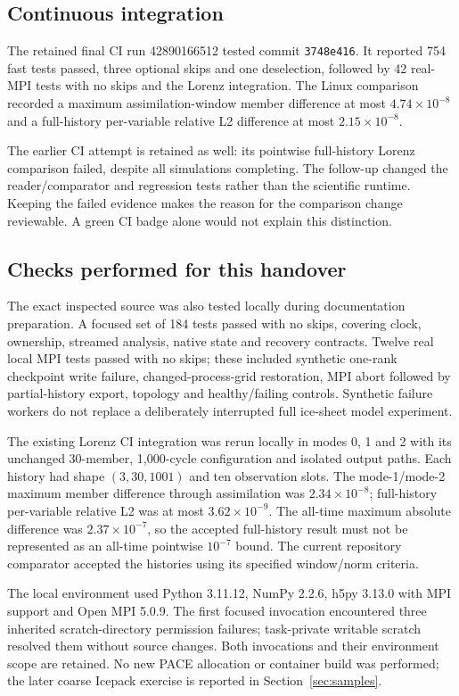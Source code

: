 \documentclass[11pt,a4paper]{article}
\newcommand{\code}[1]{\nolinkurl{#1}}
\begin{document}
\subsection{Continuous integration}
The retained final CI run 42890166512 tested commit \code{3748e416}. It reported 754 fast tests passed, three optional skips and one deselection, followed by 42 real-MPI tests with no skips and the Lorenz integration. The Linux comparison recorded a maximum assimilation-window member difference at most \(4.74\times10^{-8}\) and a full-history per-variable relative L2 difference at most \(2.15\times10^{-8}\).

The earlier CI attempt is retained as well: its pointwise full-history Lorenz comparison failed, despite all simulations completing. The follow-up changed the reader/comparator and regression tests rather than the scientific runtime. Keeping the failed evidence makes the reason for the comparison change reviewable. A green CI badge alone would not explain this distinction.

\subsection{Checks performed for this handover}
The exact inspected source was also tested locally during documentation preparation. A focused set of 184 tests passed with no skips, covering clock, ownership, streamed analysis, native state and recovery contracts. Twelve real local MPI tests passed with no skips; these included synthetic one-rank checkpoint write failure, changed-process-grid restoration, MPI abort followed by partial-history export, topology and healthy/failing controls. Synthetic failure workers do not replace a deliberately interrupted full ice-sheet model experiment.

The existing Lorenz CI integration was rerun locally in modes 0, 1 and 2 with its unchanged 30-member, 1,000-cycle configuration and isolated output paths. Each history had shape \((3,30,1001)\) and ten observation slots. The mode-1/mode-2 maximum member difference through assimilation was \(2.34\times10^{-8}\); full-history per-variable relative L2 was at most \(3.62\times10^{-9}\). The all-time maximum absolute difference was \(2.37\times10^{-7}\), so the accepted full-history result must not be represented as an all-time pointwise \(10^{-7}\) bound. The current repository comparator accepted the histories using its specified window/norm criteria.

The local environment used Python 3.11.12, NumPy 2.2.6, h5py 3.13.0 with MPI support and Open MPI 5.0.9. The first focused invocation encountered three inherited scratch-directory permission failures; task-private writable scratch resolved them without source changes. Both invocations and their environment scope are retained. No new PACE allocation or container build was performed; the later coarse Icepack exercise is reported in Section~\ref{sec:samples}.
\end{document}
